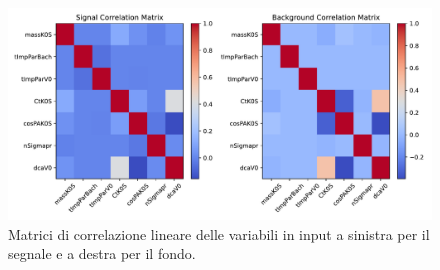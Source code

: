     \begin{figure}[h!]
        \centering
        \includegraphics[width=1\linewidth]{res/fig/3-chapter/4-correlation-matrix.pdf}
        \caption{Matrici di correlazione lineare delle variabili in input a sinistra per il segnale e a destra per il fondo.}
        \label{fig:3-4-correlation-matrix}
    \end{figure}

\newpage

